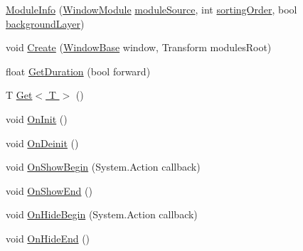 \begin{DoxyCompactItemize}
\item 
\hyperlink{class_unity_engine_1_1_u_i_1_1_windows_1_1_modules_1_1_modules_1_1_module_info_a7f87d362a903ae0d12b7f946ec389603}{Module\+Info} (\hyperlink{class_unity_engine_1_1_u_i_1_1_windows_1_1_window_module}{Window\+Module} \hyperlink{class_unity_engine_1_1_u_i_1_1_windows_1_1_modules_1_1_modules_1_1_module_info_ab543422b01bdef66c2fe6c7e04f20b82}{module\+Source}, int \hyperlink{class_unity_engine_1_1_u_i_1_1_windows_1_1_modules_1_1_modules_1_1_module_info_aa90a6cca9d59559107ed05065efc2f34}{sorting\+Order}, bool \hyperlink{class_unity_engine_1_1_u_i_1_1_windows_1_1_modules_1_1_modules_1_1_module_info_a997a22798767e512e30ac707b2e29d8e}{background\+Layer})
\item 
void \hyperlink{class_unity_engine_1_1_u_i_1_1_windows_1_1_modules_1_1_modules_1_1_module_info_a32904eee2b732ea7a01574aa4546ef71}{Create} (\hyperlink{class_unity_engine_1_1_u_i_1_1_windows_1_1_window_base}{Window\+Base} window, Transform modules\+Root)
\item 
float \hyperlink{class_unity_engine_1_1_u_i_1_1_windows_1_1_modules_1_1_modules_1_1_module_info_ae3b8c60c3081eea06fd1505d088613f0}{Get\+Duration} (bool forward)
\item 
T \hyperlink{class_unity_engine_1_1_u_i_1_1_windows_1_1_modules_1_1_modules_1_1_module_info_ab744d3f4abfc7ecee57885b3b09386d6}{Get$<$ T $>$} ()
\item 
void \hyperlink{class_unity_engine_1_1_u_i_1_1_windows_1_1_modules_1_1_modules_1_1_module_info_abcc1f2bc336b26add45be5e1a9ba86ac}{On\+Init} ()
\item 
void \hyperlink{class_unity_engine_1_1_u_i_1_1_windows_1_1_modules_1_1_modules_1_1_module_info_a920e823c5d11b1ff7a57ee91d44cdf9e}{On\+Deinit} ()
\item 
void \hyperlink{class_unity_engine_1_1_u_i_1_1_windows_1_1_modules_1_1_modules_1_1_module_info_af310e7611218a9f44da517d7daec3521}{On\+Show\+Begin} (System.\+Action callback)
\item 
void \hyperlink{class_unity_engine_1_1_u_i_1_1_windows_1_1_modules_1_1_modules_1_1_module_info_a46ed2f1acda0c353b60aab1982543627}{On\+Show\+End} ()
\item 
void \hyperlink{class_unity_engine_1_1_u_i_1_1_windows_1_1_modules_1_1_modules_1_1_module_info_a9fa9f4207e821a9e6c28c97289afe445}{On\+Hide\+Begin} (System.\+Action callback)
\item 
void \hyperlink{class_unity_engine_1_1_u_i_1_1_windows_1_1_modules_1_1_modules_1_1_module_info_a1686275e5bae8b9f23e29505167a38be}{On\+Hide\+End} ()
\end{DoxyCompactItemize}
